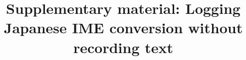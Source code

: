 \documentclass[pdflatex,sn-apa]{sn-jnl}
\begin{document}
\title{Supplementary material: Logging Japanese IME conversion without recording text}

\maketitle



\clearpage


\clearpage


\clearpage


\clearpage


\clearpage


\clearpage


\clearpage


\clearpage


\clearpage


\clearpage

\end{document}
